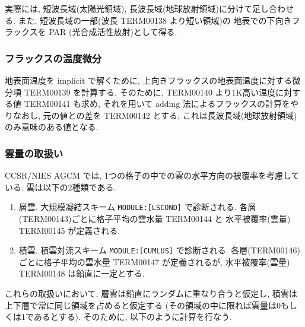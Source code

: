実際には, 短波長域(太陽光領域), 
長波長域(地球放射領域)に分けて足し合わせる.
また, 短波長域の一部(波長 TERM00138 より短い領域)の
地表での下向きフラックスを PAR (光合成活性放射)として得る.

\subsubsection{フラックスの温度微分}

地表面温度を implicit で解くために,
上向きフラックスの地表面温度に対する微分項
TERM00139 を計算する.
そのために, TERM00140 より1K高い温度に対する値 
TERM00141 も求め, それを用いて
adding 法によるフラックスの計算をやりなおし,
元の値との差を TERM00142 とする.
これは長波長域(地球放射領域)のみ意味のある値となる.

\subsubsection{雲量の取扱い}

CCSR/NIES AGCM では,
1つの格子の中での雲の水平方向の被覆率を考慮している.
雲は以下の2種類である.
\begin{enumerate}
\item 層雲. 大規模凝結スキーム \texttt{MODULE:[LSCOND]} で診断される.
      各層(TERM00143)ごとに格子平均の雲水量 TERM00144 と
      水平被覆率(雲量) TERM00145 が定義される.      
\item 積雲. 積雲対流スキーム \texttt{MODULE:[CUMLUS]} で診断される.
      各層(TERM00146)ごとに格子平均の雲水量 TERM00147 が定義されるが,
      水平被覆率(雲量) TERM00148 は鉛直に一定とする.
\end{enumerate}
これらの取扱いにおいて, 層雲は鉛直にランダムに重なり合うと仮定し,
積雲は上下層で常に同じ領域を占めると仮定する
(その領域の中に限れば雲量は0もしくは1であるとする).
そのために, 以下のように計算を行なう.

